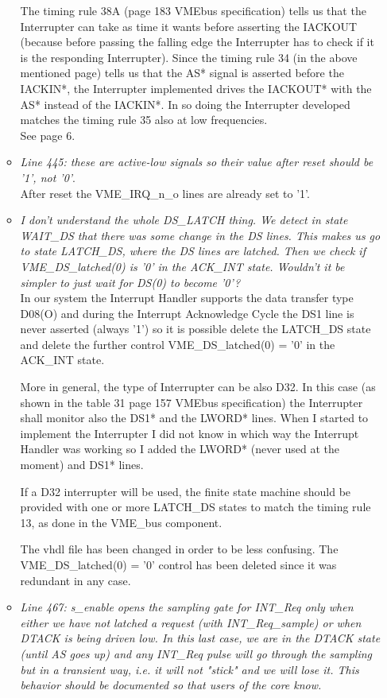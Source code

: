 \documentclass[a4paper,11pt]{article}
\begin{document}
\begin{itemize}
\begin{itemize}
The timing rule 38A (page 183 VMEbus specification) tells us that the Interrupter can take as time it wants before asserting the IACKOUT (because before passing the falling edge the Interrupter has to check if it is the responding Interrupter). Since the timing rule 34 (in the above mentioned page) tells us that the AS* signal is asserted before the IACKIN*, the Interrupter implemented drives the 
IACKOUT* with the AS* instead of the IACKIN*. In so doing the Interrupter developed matches the timing rule 35 also at low frequencies.\\ See page 6.

\item \textit{Line 445: these are active-low signals so their value after reset
should be '1', not '0'}.\\

After reset the VME\_IRQ\_n\_o lines are already set to '1'.

\item \textit{I don't understand the whole DS\_LATCH thing. We detect in state
WAIT\_DS that there was some change in the DS lines. This makes us go
to state LATCH\_DS, where the DS lines are latched. Then we check if
VME\_DS\_latched(0) is '0' in the ACK\_INT state. Wouldn't it be simpler
to just wait for DS(0) to become '0'?}\\

In our system the Interrupt Handler supports the data transfer type D08(O) and during the Interrupt Acknowledge Cycle the DS1 line is never asserted (always '1') so it is possible delete the LATCH\_DS state and 
delete the further control VME\_DS\_latched(0) = '0' in the ACK\_INT state.

More in general, the type of Interrupter can be also D32. In this case (as shown in the table 31 page 157 VMEbus specification) the Interrupter shall monitor also the DS1* and the LWORD* lines. When I started to implement the Interrupter I did not know in which way the Interrupt Handler was working so I added the LWORD* (never used at the moment) and DS1* lines.

If a D32 interrupter will be used, the finite state machine should be provided with one or more LATCH\_DS states  to match the timing rule 13, as done in the VME\_bus component.

The vhdl file has been changed in order to be less confusing. The VME\_DS\_latched(0) = '0' control has been deleted since it was redundant in any case.

\item \textit{Line 467: s\_enable opens the sampling gate for INT\_Req only when
either we have not latched a request (with INT\_Req\_sample) or when
DTACK is being driven low. In this last case, we are in the DTACK
state (until AS goes up) and any INT\_Req pulse will go through the
sampling but in a transient way, i.e. it will not "stick" and we will
lose it. This behavior should be documented so that users of the core
know.}\\


\end{itemize}
\end{itemize}
\end{document}
